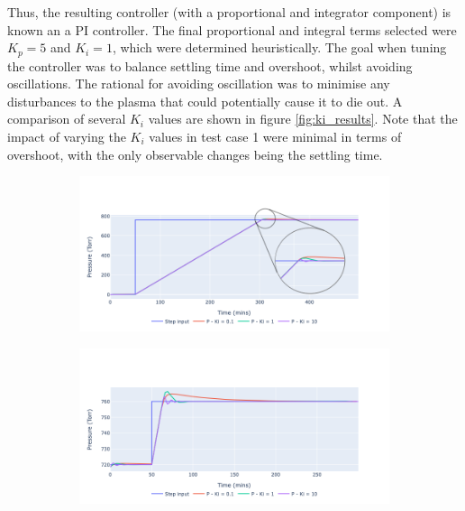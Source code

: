 Thus, the resulting controller (with a proportional and integrator component) is known an a PI controller. The final proportional and integral terms selected were $K_p = 5$ and $K_i = 1$, which were determined heuristically. The goal when tuning the controller was to balance settling time and overshoot, whilst avoiding oscillations. The rational for avoiding oscillation was to minimise any disturbances to the plasma that could potentially cause it to die out. A comparison of several $K_i$ values are shown in figure \ref{fig:ki_results}. Note that the impact of varying the $K_i$ values in test case 1 were minimal in terms of overshoot, with the only observable changes being the settling time. 

\begin{figure}[h!]
    \centering
    \begin{subfigure}{0.8\linewidth}
        \centering
        \includegraphics[width=\linewidth]{chapter_5/figures/test_1_ki.png}
        \caption{}
    \end{subfigure}
    \begin{subfigure}{0.8\linewidth}
        \centering
        \includegraphics[width=\linewidth]{chapter_5/figures/test_2_ki.png}
        \caption{}
    \end{subfigure}
   

\end{figure}

